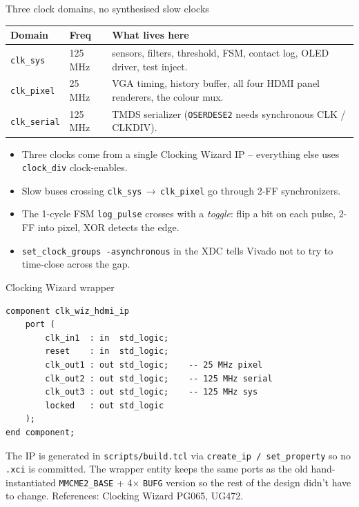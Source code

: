 \documentclass[aspectratio=169,10pt]{beamer}
\begin{document}
\begin{frame}{Three clock domains, no synthesised slow clocks}
    \begin{tabular}{p{22mm} p{18mm} p{75mm}}
        \toprule
        Domain & Freq & What lives here \\
        \midrule
        \texttt{clk\_sys}    & 125 MHz & sensors, filters, threshold,
            FSM, contact log, OLED driver, test inject. \\
        \texttt{clk\_pixel}  & 25 MHz  & VGA timing, history buffer,
            all four HDMI panel renderers, the colour mux. \\
        \texttt{clk\_serial} & 125 MHz & TMDS serializer
            (\texttt{OSERDESE2} needs synchronous CLK / CLKDIV). \\
        \bottomrule
    \end{tabular}
    \vspace{2mm}
    \begin{itemize}
        \item Three clocks come from a single Clocking Wizard IP --
              everything else uses \texttt{clock\_div} clock-enables.
        \item Slow buses crossing \texttt{clk\_sys}\,$\rightarrow$\,\texttt{clk\_pixel}
              go through 2-FF synchronizers.
        \item The 1-cycle FSM \texttt{log\_pulse} crosses with a
              \emph{toggle}: flip a bit on each pulse, 2-FF into
              pixel, XOR detects the edge.
        \item \texttt{set\_clock\_groups -asynchronous} in the XDC
              tells Vivado not to try to time-close across the gap.
    \end{itemize}
\end{frame}

\begin{frame}[fragile]{Clocking Wizard wrapper}
\begin{lstlisting}[style=vhdl]
component clk_wiz_hdmi_ip
    port (
        clk_in1  : in  std_logic;
        reset    : in  std_logic;
        clk_out1 : out std_logic;    -- 25 MHz pixel
        clk_out2 : out std_logic;    -- 125 MHz serial
        clk_out3 : out std_logic;    -- 125 MHz sys
        locked   : out std_logic
    );
end component;
\end{lstlisting}
\scriptsize The IP is generated in \texttt{scripts/build.tcl} via
\texttt{create\_ip\,/\,set\_property} so no \texttt{.xci} is committed.
The wrapper entity keeps the same ports as the old hand-instantiated
\texttt{MMCME2\_BASE} + 4$\times$ \texttt{BUFG} version so the rest of
the design didn't have to change. References: Clocking Wizard PG065,
UG472.
\end{frame}
\end{document}
